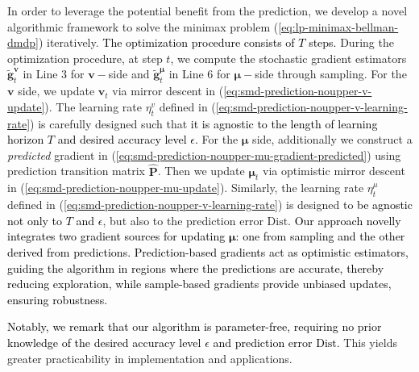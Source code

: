 \documentclass[12pt]{article}
\begin{document}
In order to leverage the potential benefit from the prediction, we develop a novel algorithmic framework to solve the minimax problem (\ref{eq:lp-minimax-bellman-dmdp}) iteratively. 
\textcolor{black}{The optimization procedure consists of $T$ steps.} During the optimization procedure, at step $t$, we compute the stochastic gradient estimators $\tilde{\boldsymbol{g}}^{\boldsymbol{v}}_t$ in Line 3 for $\boldsymbol{v}-$side and $\tilde{\boldsymbol{g}}^{\boldsymbol{\mu}}_t$ in Line 6 for $\boldsymbol{\mu}-$side through sampling. 
For the $\boldsymbol{v}$ side, we update $\boldsymbol{v}_t$ via mirror descent in (\ref{eq:smd-prediction-noupper-v-update}). The learning rate $\eta_t^{v}$ defined in (\ref{eq:smd-prediction-noupper-v-learning-rate}) is carefully designed such that \textcolor{black}{it is agnostic to the length of learning horizon $T$ and desired accuracy level $\epsilon$.} 
For the $\boldsymbol{\mu}$ side, additionally we construct a \textit{predicted} gradient in (\ref{eq:smd-prediction-noupper-mu-gradient-predicted}) using prediction transition matrix $\hat{\boldsymbol{\text{P}}}$. Then we update $\boldsymbol{\mu}_t$ via optimistic mirror descent in (\ref{eq:smd-prediction-noupper-mu-update}).
Similarly, the learning rate $\eta_t^{\mu}$ defined in (\ref{eq:smd-prediction-noupper-v-learning-rate}) is designed to \textcolor{black}{be agnostic not only to $T$ and $\epsilon$}, but also to the prediction error $\text{Dist}$.
\textcolor{black}{Our approach novelly integrates two gradient sources for updating $\boldsymbol{\mu}$: one from sampling and the other derived from predictions. Prediction-based gradients act as optimistic estimators, guiding the algorithm in regions where the predictions are accurate, thereby reducing exploration, while sample-based gradients provide unbiased updates, ensuring robustness.}

\textcolor{black}{Notably, we remark that our algorithm is parameter-free, requiring no prior knowledge of the desired accuracy level $\epsilon$ and prediction error $\text{Dist}$.} This yields greater practicability in implementation and applications.
\end{document}
